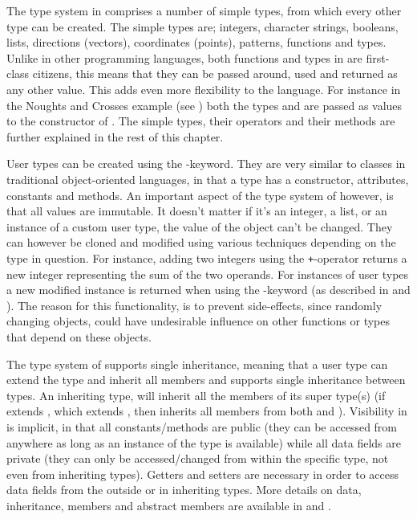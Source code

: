 The type system in \productname{} comprises a number of simple types, from which
every other type can be created. The simple types are; integers, character
strings, booleans, lists, directions (vectors), coordinates (points), patterns,
functions and types. Unlike in other programming languages, both functions and
types in \productname{} are first-class citizens, this means that they can
be passed around, used and returned as any other value. This adds even more
flexibility to the language. For instance in the Noughts and Crosses example
(see ) both the types  and
 are passed as values to the constructor of . The
simple types, their operators and their methods are further explained in the
rest of this chapter.

User types can be created using the -keyword. They are very
similar to classes in traditional object-oriented languages, in that a type has
a constructor, attributes, constants and methods. An important aspect of the
type system of \productname{} however, is that all values are immutable. It
doesn't matter if it's an integer, a list, or an instance of a custom user type,
the value of the object can't be changed. They can however be cloned and
modified using various techniques depending on the type in question. For
instance, adding two integers using the \texttt{+}-operator returns a new
integer representing the sum of the two operands. For instances of user types a
new modified instance is returned when using the -keyword (as
described in  and ). The
reason for this functionality, is to prevent side-effects, since randomly
changing objects, could have undesirable influence on other functions or types
that depend on these objects.

The type system of \productname{} supports single inheritance, meaning that a
user type  can extend the type  and inherit all members and 
\productname{} supports single inheritance between types. An inheriting type, will
inherit all the members of its super type(s) (if  extends , which
extends , then  inherits all members from both  and
). Visibility in \productname{} is implicit, in that all
constants/methods are public (they can be accessed from anywhere as long as an
instance of the type is available) while all data fields are private (they can
only be accessed/changed from within the specific type, not even from inheriting
types). Getters and setters are necessary in order to access data fields from
the outside or in inheriting types. More details on data, inheritance, members
and abstract members are available in  and
.

